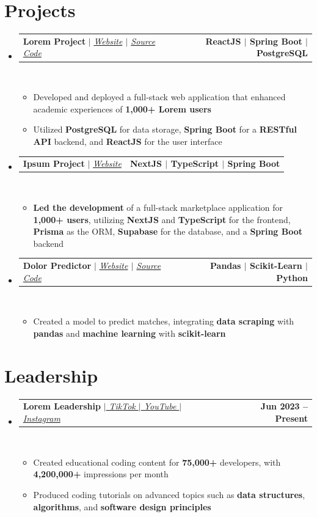 \documentclass[letterpaper,11pt]{article}
\makeatletter
\newcommand{\resumeItem}[1]{
  \item\small{
    {#1 \vspace{0pt}}
  }
}
\newcommand{\resumeProjectHeading}[2]{
    \item
    \begin{tabular*}{1.001\textwidth}{l@{\extracolsep{\fill}}r}
      \small#1 & \textbf{\small #2}\\
    \end{tabular*}\vspace{-7pt}
}
\newcommand{\resumeSubHeadingListStart}{\begin{itemize}[leftmargin=0.0in, label={}]}
\newcommand{\resumeSubHeadingListEnd}{\end{itemize}}\vspace{0pt}
\newcommand{\resumeItemListStart}{\begin{itemize}}
\newcommand{\resumeItemListEnd}{\end{itemize}\vspace{-5pt}}
\makeatother
\begin{document}
\section{Projects} 
    \vspace{-5pt}
    \resumeSubHeadingListStart
    \resumeProjectHeading
            {\textbf{{Lorem Project}} $|$ \emph{\href{https://loremipsum.com/}{Website}{ $|$ }\href{https://github.com/samarthsaxena2004}{Source Code}}}{ReactJS $|$ Spring Boot $|$ PostgreSQL}
            \\[5mm]
          \resumeItemListStart
            \resumeItem{Developed and deployed a full-stack web application that enhanced academic experiences of \textbf{1,000+ Lorem users}}
            \resumeItem{Utilized \textbf{PostgreSQL} for data storage, \textbf{Spring Boot} for a \textbf{RESTful API} backend, and \textbf{ReactJS} for the user interface}
          \resumeItemListEnd
 \vspace{-20pt}
 \resumeProjectHeading
            {\textbf{{Ipsum Project}} $|$ \emph{\href{https://loremipsum.com/}{Website}}}{NextJS $|$ TypeScript $|$ Spring Boot}
            \\[5mm]
          \resumeItemListStart
            \resumeItem{\textbf{Led the development} of a full-stack marketplace application for \textbf{1,000+ users}, utilizing \textbf{NextJS} and \textbf{TypeScript} for the frontend, \textbf{Prisma} as the ORM, \textbf{Supabase} for the database, and a \textbf{Spring Boot} backend}
          \resumeItemListEnd
 \vspace{-17pt}
 \resumeProjectHeading
{\textbf{{Dolor Predictor}} $|$ \emph{\href{https://loremipsum.com/}{Website}{ $|$ }\href{https://github.com/samarthsaxena2004}{Source Code}}}{Pandas $|$ Scikit-Learn $|$ Python}
\\[5mm]
\resumeItemListStart
\resumeItem{Created a model to predict matches, integrating \textbf{data scraping} with \textbf{pandas} and \textbf{machine learning} with \textbf{scikit-learn}}
\resumeItemListEnd

\resumeSubHeadingListEnd
\vspace{-28pt}
\section{Leadership} 
    \vspace{-5pt}
    \resumeSubHeadingListStart
                    \resumeProjectHeading
            {\textbf{{Lorem Leadership}} $|$\emph{{\href{https://loremipsum.com}{ TikTok $|$}\href{https://loremipsum.com}{ YouTube $|$}\href{https://loremipsum.com}{ Instagram}}}}{Jun 2023 -- Present}
            \\[5mm]
          \resumeItemListStart
            \resumeItem{Created educational coding content for \textbf{75,000+} developers, with \textbf{4,200,000+} impressions per month}
            \resumeItem{Produced coding tutorials on advanced topics such as \textbf{data structures}, \textbf{algorithms}, and \textbf{software design principles}}
          \resumeItemListEnd
          \resumeSubHeadingListEnd
 \vspace{-12pt}
\end{document}
